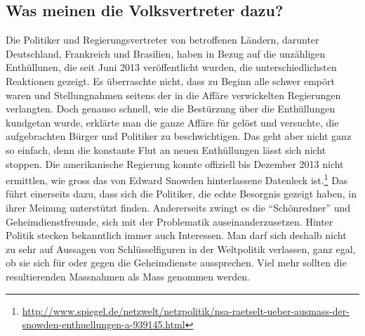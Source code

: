 \subsection{Was meinen die Volksvertreter dazu?}
Die Politiker und Regierungsvertreter von betroffenen Ländern, darunter Deutschland, Frankreich und Brasilien, haben in Bezug auf die unzähligen Enthüllunen, die seit Juni 2013 veröffentlicht wurden, die unterschiedlichsten Reaktionen gezeigt. Es überraschte nicht, dass zu Beginn alle schwer empört waren und Stellungnahmen seitens der in die Affäre verwickelten Regierungen verlangten. Doch genauso schnell, wie die Bestürzung über die Enthüllungen kundgetan wurde, erklärte man die ganze Affäre für gelöst und versuchte, die aufgebrachten Bürger und Politiker zu beschwichtigen. Das geht aber nicht ganz so einfach, denn die konstante Flut an neuen Enthüllungen lässt sich nicht stoppen. Die amerikanische Regierung konnte offiziell bis Dezember 2013 nicht ermittlen, wie gross das von Edward Snowden hinterlassene Datenleck ist.\footnote{\url{http://www.spiegel.de/netzwelt/netzpolitik/nsa-raetselt-ueber-ausmass-der-snowden-enthuellungen-a-939145.html}}
Das führt einerseits dazu, dass sich die Politiker, die echte Besorgnis gezeigt haben, in ihrer Meinung unterstützt finden. Andererseits zwingt es die ``Schönredner'' und Geheimdienstfreunde, sich mit der Problematik auseinanderzusetzen.
Hinter Politik stecken bekanntlich immer auch Interessen. Man darf sich deshalb nicht zu sehr auf Aussagen von Schlüsselfiguren in der Weltpolitik verlassen, ganz egal, ob sie sich für oder gegen die Geheimdienste aussprechen. Viel mehr sollten die resultierenden Massnahmen als Mass genommen werden.

